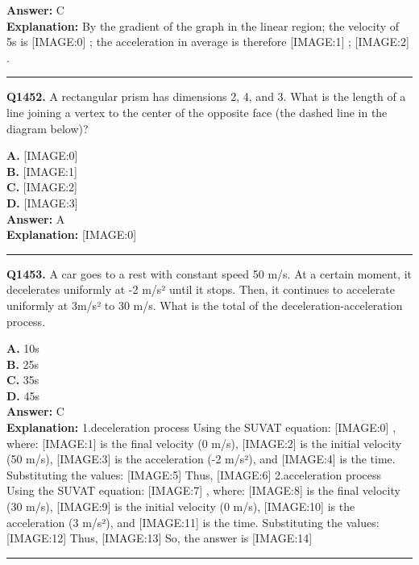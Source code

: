 \documentclass[12pt]{article}
\begin{document}
\textbf{Answer:} C \\
\textbf{Explanation:} By the gradient of the graph in the linear region; the velocity of 5s is
[IMAGE:0]
; the acceleration in average is therefore
[IMAGE:1]
;
[IMAGE:2]
.

\hrule
\vspace{1em}


\noindent
\textbf{Q1452.} A rectangular prism has dimensions 2, 4, and 3. What is the length of a line joining a vertex to the center of the opposite face (the dashed line in the diagram below)?



\textbf{A.} [IMAGE:0] \\
\textbf{B.} [IMAGE:1] \\
\textbf{C.} [IMAGE:2] \\
\textbf{D.} [IMAGE:3] \\

\textbf{Answer:} A \\
\textbf{Explanation:} [IMAGE:0]

\hrule
\vspace{1em}


\noindent
\textbf{Q1453.} A car goes to a rest with constant speed 50 m/s. At a certain moment, it decelerates uniformly at -2 m/s² until it stops. Then, it continues to accelerate uniformly at 3m/s² to 30 m/s. What is the total of the deceleration-acceleration process.



\textbf{A.} 10s \\
\textbf{B.} 25s \\
\textbf{C.} 35s \\
\textbf{D.} 45s \\

\textbf{Answer:} C \\
\textbf{Explanation:} 1.deceleration process
Using the SUVAT equation:
[IMAGE:0]
, where:
[IMAGE:1]
is the final velocity (0 m/s),
[IMAGE:2]
is the initial velocity (50 m/s),
[IMAGE:3]
is the acceleration (-2 m/s²), and
[IMAGE:4]
is the time.
Substituting the values:
[IMAGE:5]
Thus,
[IMAGE:6]
2.acceleration process
Using the SUVAT equation:
[IMAGE:7]
, where:
[IMAGE:8]
is the final velocity (30 m/s),
[IMAGE:9]
is the initial velocity (0 m/s),
[IMAGE:10]
is the acceleration (3 m/s²), and
[IMAGE:11]
is the time.
Substituting the values:
[IMAGE:12]
Thus,
[IMAGE:13]
So, the answer is
[IMAGE:14]

\hrule
\vspace{1em}
\end{document}
